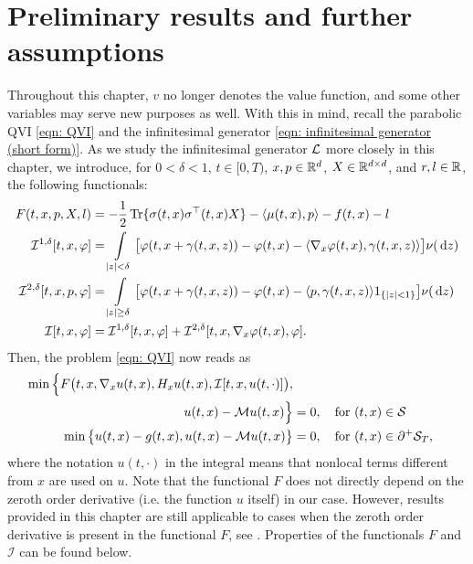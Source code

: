 \section{Preliminary results and further assumptions}
\label{section: Preliminary Results for the Proof of Uniqueness}
Throughout this chapter, $v$ no longer denotes the value function, and some other variables may serve new purposes as well. With this in mind, recall the parabolic QVI \eqref{eqn: QVI} and the infinitesimal generator \eqref{eqn: infinitesimal generator (short form)}. As we study the infinitesimal generator $\mathcal{L}$ more closely in this chapter, we introduce, for $0<\delta<1$, $t \in [0,T)$, $x,p \in \mathbb{R}^d$, $X \in \mathbb{R}^{d \times d}$, and $r,l \in \mathbb{R}$, the following functionals:
\begin{align*}
    F(t,x,p,X,l) &= - \frac{1}{2} \operatorname{Tr}\{ \sigma (t,x) \sigma^\top (t,x) X \} - \langle \mu (t,x), p \rangle - f(t,x) - l \\
    \mathcal{I}^{1,\delta}[t,x,\varphi] &= \int\limits_{|z|<\delta} \big[ \varphi(t,x+\gamma(t,x,z)) - \varphi(t,x) - \langle \nabla_x \varphi (t,x), \gamma(t,x,z) \rangle \big] \nu(\,\mathrm{d} z) \\
    \mathcal{I}^{2,\delta}[t,x,p,\varphi] &= \int\limits_{|z|\geq \delta} \big[ \varphi(t,x+\gamma(t,x,z)) - \varphi(t,x) - \langle p, \gamma(t,x,z) \rangle 1_{\left\{|z|<1\right\}} \big] \nu(\,\mathrm{d} z) \\
    \mathcal{I}[t,x,\varphi] &= \mathcal I^{1,\delta}[t,x,\varphi] + \mathcal  I^{2,\delta}[t,x,\nabla_x \varphi(t,x),\varphi]. 
\end{align*}
Then, the problem \ref{eqn: QVI} now reads as
\begin{align}
    \min \Big \{ F\big(t,x, \nabla_x u(t,x), H_x u(t,x), \mathcal{I}[t,x,u(t,\cdot)]\big), \nonumber \\
    u(t,x) - \mathcal{M} u(t,x) \Big\} &= 0, \quad \text{for } (t,x) \in \mathcal{S} \nonumber \\
    \min \big\{ u(t,x) - g(t,x), u(t,x) - \mathcal{M} u(t,x) \big\} &= 0, \quad \text{for } (t,x) \in \partial^+ \mathcal{S}_T,
    \label{eqn: QVI with functionals}
\end{align}
where the notation $u(t, \cdot)$ in the integral means that nonlocal terms different from $x$ are used on $u$. Note that the functional $F$ does not directly depend on the zeroth order derivative (i.e. the function $u$ itself) in our case. However, results provided in this chapter are still applicable to cases when the zeroth order derivative is present in the functional $F$, see \cite[Section 5]{seydel2010generalexistenceuniquenessviscosity}. Properties of the functionals $F$ and $\mathcal{I}$ can be found below.
